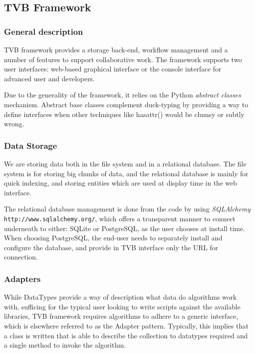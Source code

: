 	\subsection{TVB Framework}

	\subsubsection{General description}

TVB framework provides a storage back-end, workflow management and a number of features to
support collaborative work. The framework supports two user interfaces: web-based graphical interface or the
console interface for advanced user and developers.

Due to the generality of the framework, it relies on the Python \emph{abstract classes} mechanism.
Abstract base classes complement duck-typing by providing a way to define
interfaces when other techniques like hasattr() would be clumsy or subtly wrong.

\subsubsection{Data Storage}

We are storing data both in the file system and in a relational database.
The file system is for storing big chunks of data, and the relational database is mainly for quick indexing, 
and storing entities which are used at display time in the web interface.

The relational database management is done from the code by using \emph{SQLAlchemy} \texttt{http://www.sqlalchemy.org/}, 
which offers a transparent manner to connect underneath to either: SQLite or PostgreSQL, as the user chooses at install time.
When choosing PostgreSQL, the end-user needs to separately install and configure the database, and provide in TVB
interface only the URL for connection.



\subsubsection{Adapters}

While DataTypes provide a way of description what data do algorithms work with, 
sufficing for the typical user looking to write scripts against the
available libraries, TVB framework requires algorithms to adhere to 
a generic interface, which is elsewhere referred to as the Adapter pattern.
Typically, this implies that a class is written that is able to describe
the collection to datatypes required and a single method to invoke the
algorithm.

